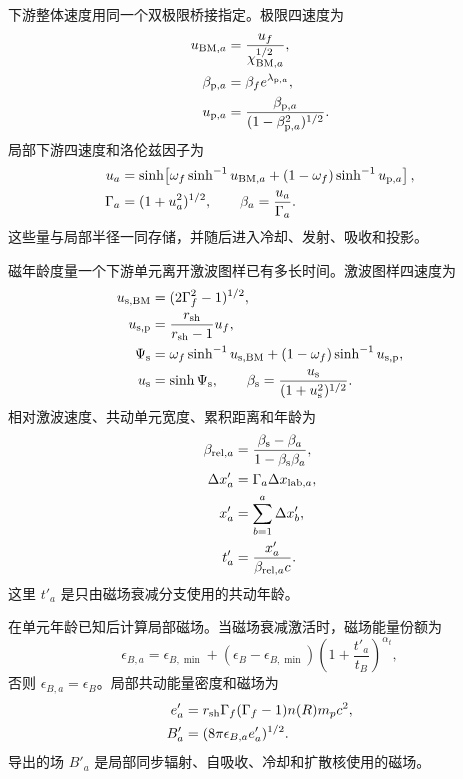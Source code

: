 \documentclass[twocolumn]{aastex702}
\begin{document}
下游整体速度用同一个双极限桥接指定。极限四速度为
\begin{equation}
\begin{aligned}
u_{{\rm BM},a}&=\frac{u_f}{\chi_{{\rm BM},a}^{1/2}},\\
\beta_{{\rm p},a}&=\beta_f e^{\lambda_{{\rm p},a}},\\
u_{{\rm p},a}&=\frac{\beta_{{\rm p},a}}
{(1-\beta_{{\rm p},a}^2)^{1/2}} .
\end{aligned}
\end{equation}
局部下游四速度和洛伦兹因子为
\begin{equation}
\begin{aligned}
u_a&=\sinh\!\left[\omega_f\sinh^{-1}u_{{\rm BM},a}
+(1-\omega_f)\sinh^{-1}u_{{\rm p},a}\right],\\
\Gamma_a&=(1+u_a^2)^{1/2},\qquad
\beta_a=\frac{u_a}{\Gamma_a}.
\end{aligned}
\end{equation}
这些量与局部半径一同存储，并随后进入冷却、发射、吸收和投影。

磁年龄度量一个下游单元离开激波图样已有多长时间。激波图样四速度为
\begin{equation}
\begin{aligned}
u_{\rm s,BM}&=(2\Gamma_f^2-1)^{1/2},\\
u_{\rm s,p}&=\frac{r_{\rm sh}}{r_{\rm sh}-1}u_f,\\
\Psi_{\rm s}&=\omega_f\sinh^{-1}u_{\rm s,BM}
+(1-\omega_f)\sinh^{-1}u_{\rm s,p},\\
u_{\rm s}&=\sinh\Psi_{\rm s},\qquad
\beta_{\rm s}=\frac{u_{\rm s}}{(1+u_{\rm s}^2)^{1/2}} .
\end{aligned}
\end{equation}
相对激波速度、共动单元宽度、累积距离和年龄为
\begin{equation}
\begin{aligned}
\beta_{{\rm rel},a}&=\frac{\beta_{\rm s}-\beta_a}
{1-\beta_{\rm s}\beta_a},\\
\Delta x'_a&=\Gamma_a\Delta x_{{\rm lab},a},\\
x'_a&=\sum_{b=1}^a\Delta x'_b,\\
t'_a&=\frac{x'_a}{\beta_{{\rm rel},a}c}.
\end{aligned}
\end{equation}
这里 \(t'_a\) 是只由磁场衰减分支使用的共动年龄。

在单元年龄已知后计算局部磁场。当磁场衰减激活时，磁场能量份额为
\begin{equation}
\epsilon_{B,a}=\epsilon_{B,\min}
+(\epsilon_B-\epsilon_{B,\min})
\left(1+\frac{t'_a}{t_B}\right)^{\alpha_t},
\end{equation}
否则 \(\epsilon_{B,a}=\epsilon_B\)。局部共动能量密度和磁场为
\begin{equation}
\begin{aligned}
e'_a&=r_{\rm sh}\Gamma_f(\Gamma_f-1)n(R)m_p c^2,\\
B'_a&=(8\pi\epsilon_{B,a}e'_a)^{1/2}.
\end{aligned}
\end{equation}
导出的场 \(B'_a\) 是局部同步辐射、自吸收、冷却和扩散核使用的磁场。
\end{document}

